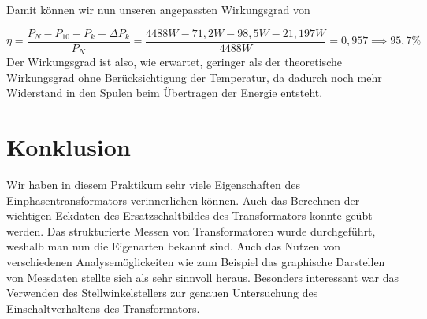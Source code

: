 \documentclass{article}
\begin{document}
Damit können wir nun unseren angepassten Wirkungsgrad von

\begin{equation*}
  \label{eq:5}
  \eta = \frac{P_{N} - P_{10} - P_{k} - \Delta P_{k}}{P_{N}} = \frac{4488W-71,2W-98,5W-21,197W}{4488W} = 0,957 \implies 95,7\%
\end{equation*}
Der Wirkungsgrad ist also, wie erwartet, geringer als der theoretische Wirkungsgrad ohne Berücksichtigung der Temperatur, da dadurch noch mehr Widerstand in den Spulen beim Übertragen der Energie entsteht.

\section{Konklusion}
\label{sec:konklusion}

Wir haben in diesem Praktikum sehr viele Eigenschaften des Einphasentransformators verinnerlichen können. Auch das Berechnen der wichtigen Eckdaten des Ersatzschaltbildes des Transformators konnte geübt werden. Das strukturierte Messen von Transformatoren wurde durchgeführt, weshalb man nun die Eigenarten bekannt sind. Auch das Nutzen von verschiedenen Analysemöglickeiten wie zum Beispiel das graphische Darstellen von Messdaten stellte sich als sehr sinnvoll heraus. Besonders interessant war das Verwenden des Stellwinkelstellers zur genauen Untersuchung des Einschaltverhaltens des Transformators.
\end{document}
